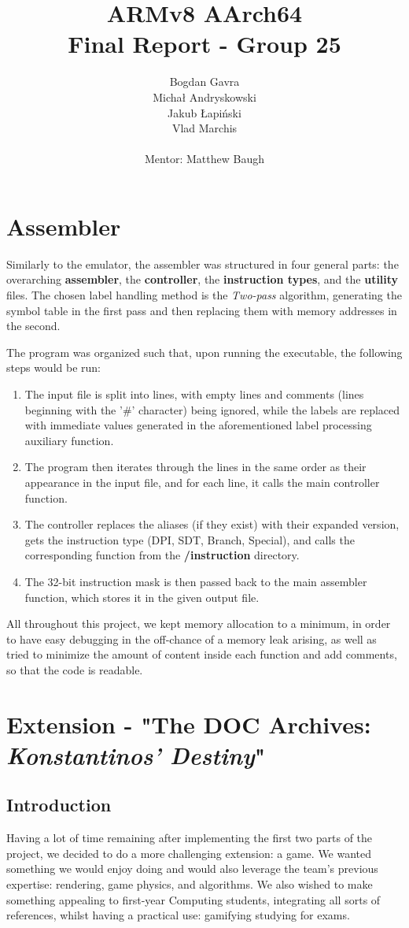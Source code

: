 \documentclass{article}
\title{ARMv8 AArch64\\
       \large Final Report - Group 25}
\author{
        Bogdan Gavra \\
        Michał Andryskowski\\
        Jakub Łapiński\\
        Vlad Marchis\\\\
        Mentor: 
        Matthew Baugh
        }
\begin{document}
\maketitle

\section{Assembler}
Similarly to the emulator, the assembler was structured in four general parts: the overarching \textbf{assembler}, the \textbf{controller}, the \textbf{instruction types}, and the \textbf{utility} files. The chosen label handling method is the \textit{Two-pass} algorithm, generating the symbol table in the first pass and then replacing them with memory addresses in the second.\par
The program was organized such that, upon running the executable, the following steps would be run:
\begin{enumerate}
    \item The input file is split into lines, with empty lines and comments (lines beginning with the '\#' character) being ignored, while the labels are replaced with immediate values generated in the aforementioned label processing auxiliary function.
    \item The program then iterates through the lines in the same order as their appearance in the input file, and for each line, it calls the main controller function.
    \item The controller replaces the aliases (if they exist) with their expanded version, gets the instruction type (DPI, SDT, Branch, Special), and calls the corresponding function from the \textbf{/instruction} directory.
    \item The 32-bit instruction mask is then passed back to the main assembler function, which stores it in the given output file.
\end{enumerate}
All throughout this project, we kept memory allocation to a minimum, in order to have easy debugging in the off-chance of a memory leak arising, as well as tried to minimize the amount of content inside each function and add comments, so that the code is readable.

\section{Extension - "The DOC Archives: \textit{Konstantinos' Destiny}"}

\subsection{Introduction}
Having a lot of time remaining after implementing the first two parts of the project, we decided to do a more challenging extension: a game. We wanted something we would enjoy doing and would also leverage the team's previous expertise: rendering, game physics, and algorithms. We also wished to make something appealing to first-year Computing students, integrating all sorts of references, whilst having a practical use: gamifying studying for exams.
\end{document}
